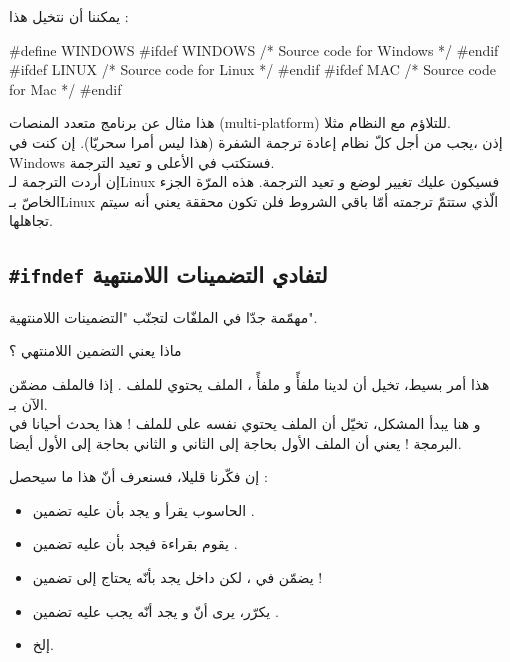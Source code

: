 يمكننا أن نتخيل هذا :
\begin{Csource}
#define WINDOWS
#ifdef WINDOWS
  /* Source code for Windows */
#endif
#ifdef LINUX
  /* Source code for Linux */
#endif
#ifdef MAC
  /* Source code for Mac */
#endif
\end{Csource}
هذا مثال عن برنامج متعدد المنصات
(\textenglish{multi-platform})
للتلاؤم مع النظام مثلا.\\
إذن ،يجب من أجل كلّ نظام إعادة ترجمة الشفرة (هذا ليس أمرا سحريّا).
إن كنت في
\textenglish{Windows}
فستكتب
في الأعلى و تعيد الترجمة.\\
إن أردت الترجمة لـ\textenglish{Linux}
فسيكون عليك تغيير
لوضع
و تعيد الترجمة. هذه المرّة الجزء الخاصّ بـ\textenglish{Linux}
الّذي ستتمّ ترجمته أمّا باقي الشروط فلن تكون محققة يعني أنه سيتم تجاهلها.

\subsection{\texttt{\#ifndef} لتفادي التضمينات اللامنتهية}
مهمّمة جدّا في الملفّات
لتجنّب "التضمينات اللامنتهية".
\begin{question}
  ماذا يعني التضمين اللامنتهي ؟
\end{question}
هذا أمر بسيط، تخيل أن لدينا ملفأً
و ملفأً
،
الملف
يحتوي
للملف
.
إذا فالملف
مضمّن الآن بـ.\\
و هنا يبدأ المشكل، تخيّل أن الملف
يحتوي نفسه على
للملف
 !
هذا يحدث أحيانا في البرمجة ! يعني أن الملف الأول بحاجة إلى الثاني و الثاني بحاجة إلى الأول أيضا.

إن فكّرنا قليلا، فسنعرف أنّ هذا ما سيحصل :
\begin{itemize}
  \item  الحاسوب يقرأ
و يجد بأن عليه تضمين
.
  \item يقوم بقراءة
فيجد بأن عليه تضمين
.
  \item  يضمّن
في
،
لكن داخل
يجد بأنّه يحتاج إلى تضمين
 !
  \item يكرّر، يرى أنّ
و يجد أنّه يجب عليه تضمين
.
  \item إلخ.
\end{itemize}

